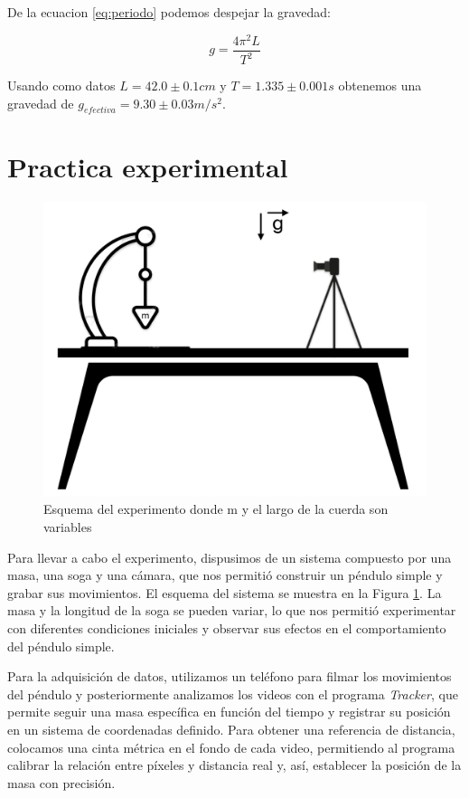 \documentclass[12pt,a4]{article}
\begin{document}
De la ecuacion \ref{eq:periodo} podemos despejar la gravedad:

\begin{equation}
    g = \frac{4 \pi^2 L}{T^2}
    \label{eq:gravedad}
\end{equation}

Usando como datos $L = 42.0 \pm 0.1 cm$ y $T = 1.335 \pm 0.001 s$ obtenemos una gravedad de $g_{efectiva} = 9.30 \pm 0.03 m/s^2$.

\section{Practica experimental}

\begin{figure}[H]
    \centering
    \includegraphics[width=0.6\linewidth]{esquema.png}
    \caption{Esquema del experimento donde m y el largo de la cuerda son variables}   
    \label{fig:esquema}
\end{figure}

Para llevar a cabo el experimento, dispusimos de un sistema compuesto por una masa, una soga y una cámara, que nos permitió construir un péndulo simple y grabar sus movimientos. El esquema del sistema se muestra en la Figura \ref{fig:esquema}. La masa y la longitud de la soga se pueden variar, lo que nos permitió experimentar con diferentes condiciones iniciales y observar sus efectos en el comportamiento del péndulo simple.

Para la adquisición de datos, utilizamos un teléfono para filmar los movimientos del péndulo y posteriormente analizamos los videos con el programa \textit{Tracker}, que permite seguir una masa específica en función del tiempo y registrar su posición en un sistema de coordenadas definido. Para obtener una referencia de distancia, colocamos una cinta métrica en el fondo de cada video, permitiendo al programa calibrar la relación entre píxeles y distancia real y, así, establecer la posición de la masa con precisión.
\end{document}
